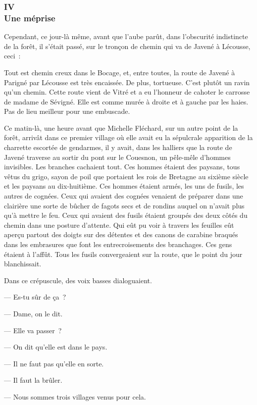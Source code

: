 \documentclass[french,twoside]{book} %
\begin{document}
 \subsubsection[{IV. Une méprise}]{IV \\
Une méprise}
\label{p3l4c4}
\noindent Cependant, ce jour-là même, avant que l’aube parût, dans l’obscurité indistincte de la forêt, il s’était passé, sur le tronçon de chemin qui va de Javené à Lécousse, ceci :\par
Tout est chemin creux dans le Bocage, et, entre toutes, la route de Javené à Parigné par Lécousse est très encaissée. De plus, tortueuse. C’est plutôt un ravin qu’un chemin. Cette route vient de Vitré et a eu l’honneur de cahoter le carrosse de madame de Sévigné. Elle est comme murée à droite et à gauche par les haies. Pas de lieu meilleur pour une embuscade.\par
Ce matin-là, une heure avant que Michelle Fléchard, sur un autre point de la forêt, arrivât dans ce premier village où elle avait eu la sépulcrale apparition de la charrette escortée de gendarmes, il y avait, dans les halliers que la route de Javené traverse au sortir du pont sur le Couesnon, un pêle-mêle d’hommes invisibles. Les branches cachaient tout. Ces hommes étaient des paysans, tous vêtus du grigo, sayon de poil que portaient les rois de Bretagne au sixième siècle et les paysans au dix-huitième. Ces hommes étaient armés,  les uns de fusils, les autres de cognées. Ceux qui avaient des cognées venaient de préparer dans une clairière une sorte de bûcher de fagots secs et de rondins auquel on n’avait plus qu’à mettre le feu. Ceux qui avaient des fusils étaient groupés des deux côtés du chemin dans une posture d’attente. Qui eût pu voir à travers les feuilles eût aperçu partout des doigts sur des détentes et des canons de carabine braqués dans les embrasures que font les entrecroisements des branchages. Ces gens étaient à l’affût. Tous les fusils convergeaient sur la route, que le point du jour blanchissait.\par
Dans ce crépuscule, des voix basses dialoguaient.\par
— Es-tu sûr de ça ?\par
— Dame, on le dit.\par
— Elle va passer ?\par
— On dit qu’elle est dans le pays.\par
— Il ne faut pas qu’elle en sorte.\par
— Il faut la brûler.\par
— Nous sommes trois villages venus pour cela.\par
\end{document}
